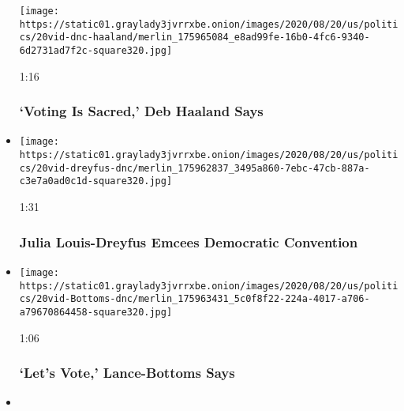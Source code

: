 \begin{itemize}
  \texttt{[image: https://static01.graylady3jvrrxbe.onion/images/2020/08/20/us/politics/20vid-dnc-haaland/merlin\_175965084\_e8ad99fe-16b0-4fc6-9340-6d2731ad7f2c-square320.jpg]}

  1:16

  \hypertarget{voting-is-sacred-deb-haaland-says}{%
  \subsubsection{`Voting Is Sacred,' Deb Haaland
  Says}\label{voting-is-sacred-deb-haaland-says}}
\item
  \href{https://www.nytimes3xbfgragh.onion/video/us/elections/100000007299846/julia-louis-dreyfus-speaks-dnc.html?action=click\&module=video-series-bar\&region=header\&pgtype=Article\&playlistId=video/2020-Elections}{}

  \texttt{[image: https://static01.graylady3jvrrxbe.onion/images/2020/08/20/us/politics/20vid-dreyfus-dnc/merlin\_175962837\_3495a860-7ebc-47cb-887a-c3e7a0ad0c1d-square320.jpg]}

  1:31

  \hypertarget{julia-louis-dreyfus-emcees-democratic-convention}{%
  \subsubsection{Julia Louis-Dreyfus Emcees Democratic
  Convention}\label{julia-louis-dreyfus-emcees-democratic-convention}}
\item
  \href{https://www.nytimes3xbfgragh.onion/video/us/elections/100000007299826/keisha-lance-bottoms-speaks-dnc.html?action=click\&module=video-series-bar\&region=header\&pgtype=Article\&playlistId=video/2020-Elections}{}

  \texttt{[image: https://static01.graylady3jvrrxbe.onion/images/2020/08/20/us/politics/20vid-Bottoms-dnc/merlin\_175963431\_5c0f8f22-224a-4017-a706-a79670864458-square320.jpg]}

  1:06

  \hypertarget{lets-vote-lance-bottoms-says}{%
  \subsubsection{`Let's Vote,' Lance-Bottoms
  Says}\label{lets-vote-lance-bottoms-says}}
\item
  \href{https://www.nytimes3xbfgragh.onion/video/us/elections/100000007299993/gavin-newsom-speaks-dnc.html?action=click\&module=video-series-bar\&region=header\&pgtype=Article\&playlistId=video/2020-Elections}{}


\end{itemize}
